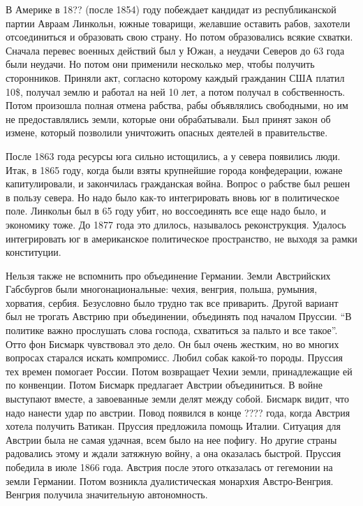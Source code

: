 \documentclass[a4paper, 12pt]{article}
\begin{document}
\begin{multicols}{2}
В Америке в 18?? (после 1854) году побеждает кандидат из республиканской партии Авраам Линкольн, южные товарищи, желавшие оставить рабов, захотели отсоединиться и образовать свою страну. Но потом образовались всякие схватки. Сначала перевес военных действий был у Южан, а неудачи Северов до 63 года были неудачи. Но потом они применили несколько мер, чтобы получить сторонников. Приняли акт, согласно которому каждый гражданин США платил 10\$, получал землю и работал на ней 10 лет, а потом получал в собственность. Потом произошла полная отмена рабства, рабы объявлялись свободными, но им не предоставлялись земли, которые они обрабатывали. Был принят закон об измене, который позволили уничтожить опасных деятелей в правительстве. 

После 1863 года ресурсы юга сильно истощились, а у севера появились люди. Итак, в 1865 году, когда были взяты крупнейшие города конфедерации, южане капитулировали, и закончилась гражданская война. Вопрос о рабстве был решен в пользу севера. Но надо было как-то интегрировать вновь юг в политическое поле. Линкольн был в 65 году убит, но воссоединять все еще надо было, и экономику тоже. До 1877 года это длилось, называлось реконструкция. Удалось интегрировать юг в американское политическое пространство, не выходя за рамки конституции. 

Нельзя также не вспомнить про объединение Германии. Земли Австрийских Габсбургов были многонациональные: чехия, венгрия, польша, румыния, хорватия, сербия. Безусловно было трудно так все приварить. Другой вариант был не трогать Австрию при объединении, объединять под началом Пруссии. ``В политике важно прослушать слова господа, схватиться за пальто и все такое''. Отто фон Бисмарк чувствовал это дело. Он был очень жестким, но во многих вопросах старался искать компромисс. Любил собак какой-то породы. Пруссия тех времен помогает России. Потом возвращает Чехии земли, принадлежащие ей по конвенции. Потом Бисмарк предлагает Австрии объединиться. В войне выступают вместе, а завоеванные земли делят между собой. Бисмарк видит, что надо нанести удар по австрии. Повод появился в конце ???? года, когда Австрия хотела получить Ватикан. Пруссия предложила помощь Италии. Ситуация для Австрии была не самая удачная, всем было на нее пофигу. Но другие страны радовались этому и ждали затяжную войну, а она оказалась быстрой. Пруссия победила в июле 1866 года. Австрия после этого отказалась от гегемонии на земли Германии. Потом возникла дуалистическая монархия Австро-Венгрия. Венгрия получила значительную автономность. 


\end{multicols}
\end{document}
